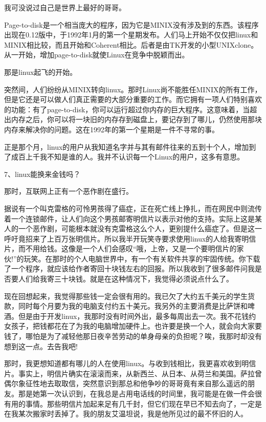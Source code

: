 我可没说过自己是世界上最好的哥哥。

Page-to-disk是一个相当庞大的程序，因为它是MINIX没有涉及到的东西。该程序出现在0.12版中，于1992年1月的第一个星期发布。人们马上开始不仅仅把linux和MINIX相比较，而且开始和Coherent相比。后者是由TK开发的小型UNIXclone。从一开始，增加page-to-disk就使Linux在竞争中脱颖而出。

那是linux起飞的开始。

突然间，人们纷纷从MINIX转向linux。那时Linux尚不能胜任MINIX的所有工作，但是它还是可以做人们真正需要的大部分重要的工作。而它拥有一项人们特别喜欢的功能：有了page-to-disk，你可以运行超过你内存的巨大程序。这意味着，当超出内存之后，你可以将一块旧的内存存到磁盘上，要记存到了哪儿，仍然使用那块内存来解决你的问题。这在1992年的第一个星期是一件不寻常的事。

正是那个月，linux的用户从我知道名字并与其有邮件往来的五到十个人，增加到了成百上千我不知是谁的人。我并不认识每一个Linux的用户，这多有意思。

 
7、linux能换来金钱吗？

那时，互联网上正有一个恶作剧在盛行。

据说有一个叫克雷格的可怜男孩得了癌症，正在死亡线上挣扎，而在网民中则流传着一个连锁邮件，让人们向这个男孩邮寄明信片以表示对他的支持。实际上这是某人的一个恶作剧，可能根本就没有克雷格这么个人，更别提什么癌症了。但是这一呼吁竟招来了上百万张明信片。所以我半开玩笑寺要求使用linux的人给我寄明信片，而不用给钱。这像是一个人们会感叹“哦，上帝，又是一个要明信片的家伙!”的玩笑。在那时的个人电脑世界中，有一个有关软件共享的牢固传统。你下载了一个程序，就应该给作者寄回十块钱左右的回报。所以我收到了很多邮件问我是否要人们给我寄三十块钱。就是在这种情况下，我觉得必须说点什么了。

现在回想起来，我觉得那些钱一定会很有用的。我已欠了大约五千美元的学生货款，同时每个月要为我的电脑支付约五十美元。我另外的主要消费是比萨饼和啤酒。但是由于开发linux，我那时没有时间外出，最多每周出去一次。我不花钱约女孩子，把钱都花在了为我的电脑增加硬件上。也许要是换一个人，就会向大家要钱了，哪怕是为了减轻他那日夜辛苦劳动的单身母亲的负担呢？唉，我那时却没有想到这一点。去告我吧!

那时，我更想知道都有哪儿的人在使用linux。与收到钱相比，我更喜欢收到明信片。事实上，明信片确实在滚滚而来，从新西兰、从日本、从荷兰和美国。萨拉曾偶尔象征性地去取取信，突然意识到那总和他争吵的哥哥竟有来自那么遥远的朋友。那是她第一次认识到，在我总是占用电话线的时间里，我可能是在做一件会很有用的事情。那些明信片加起来足有几千封，但它们现在早已不知去向了，一定是在我某次搬家时丢掉了。我的朋友艾温坦说，我是他所见过的最不怀旧的人。

